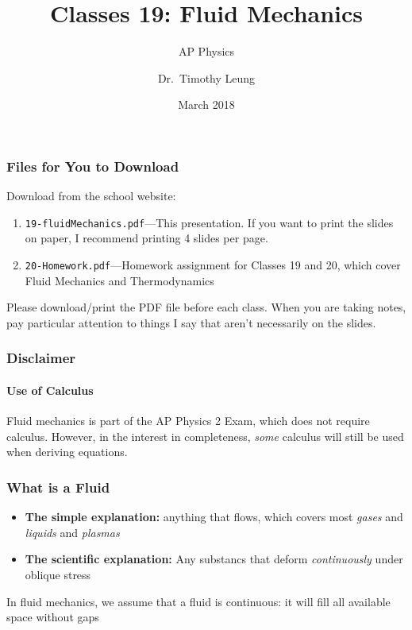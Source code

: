 \documentclass[12pt,aspectratio=169]{beamer}
\title{Classes 19: Fluid Mechanics}
\subtitle{AP Physics}
\author[TML]{Dr.\ Timothy Leung}
\institute{Olympiads School}
\date{March 2018}
\begin{document}
\begin{frame}
  \maketitle
\end{frame}



\begin{frame}
  \frametitle{Files for You to Download}
  Download from the school website:
  \begin{enumerate}
  \item\texttt{19-fluidMechanics.pdf}---This
    presentation. If you want to print the slides on paper, I recommend
    printing 4 slides per page.
  \item\texttt{20-Homework.pdf}---Homework assignment for Classes 19 and 20,
    which cover Fluid Mechanics and Thermodynamics
  \end{enumerate}

  \vspace{.2in}Please download/print the PDF file before each class. When you
  are taking notes, pay particular attention to things I say that aren't
  necessarily on the slides.
\end{frame}



\begin{frame}
  \frametitle{Disclaimer}
  \framesubtitle{Use of Calculus}
  Fluid mechanics is part of the AP Physics 2 Exam, which does not require
  calculus. However, in the interest in completeness, \emph{some} calculus will
  still be used when deriving equations.
\end{frame}



\begin{frame}
  \frametitle{What is a Fluid}

  \begin{itemize}
  \item\textbf{The simple explanation:} anything that flows, which covers
    most \emph{gases} and \emph{liquids} and \emph{plasmas}
  \item\textbf{The scientific explanation:} Any substancs that deform
    \emph{continuously} under oblique stress
  \end{itemize}

  \vspace{.2in}In fluid mechanics, we assume that a fluid is continuous:
  it will fill all available space without gaps
\end{frame}
\end{document}
